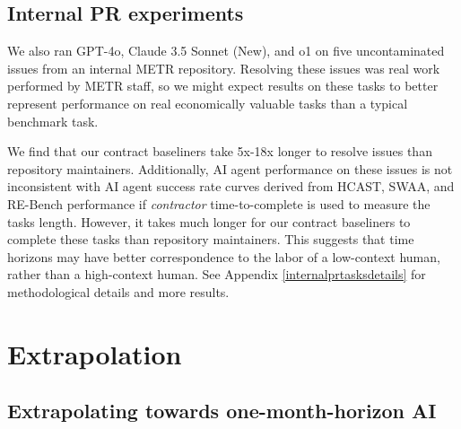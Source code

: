 \documentclass{article}
\newcommand{\gabenchmark}{HCAST}
\begin{document}
\subsection{Internal PR experiments}\label{internal-prs}
We also  ran GPT-4o, Claude 3.5 Sonnet (New), and o1 on five uncontaminated issues from an internal METR repository. Resolving these issues was real work performed by METR staff, so we might expect results on these tasks to better represent performance on real economically valuable tasks than a typical benchmark task.

We find that our contract baseliners take 5x-18x longer to resolve issues than repository maintainers. Additionally, AI agent performance on these issues is not inconsistent with AI agent success rate curves derived from \gabenchmark{}, SWAA, and RE-Bench performance if \textit{contractor} time-to-complete is used to measure the tasks length. However, it takes much longer for our contract baseliners to complete these tasks than repository maintainers. This suggests that time horizons may have better correspondence to the labor of a low-context human, rather than a high-context human. See Appendix \ref{internalprtasksdetails} for methodological details and more results.

\section{Extrapolation} \label{sec:extrapolation}

\subsection{Extrapolating towards one-month-horizon AI} \label{trend_sensitivity} 
\end{document}
